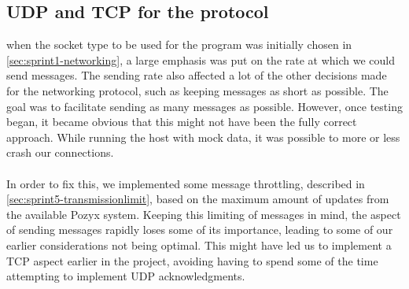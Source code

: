 \subsection{UDP and TCP for the protocol}
when the socket type to be used for the program was initially chosen in \autoref{sec:sprint1-networking}, a large emphasis was put on the rate at which we could send messages.
The sending rate also affected a lot of the other decisions made for the networking protocol, such as keeping messages as short as possible.
The goal was to facilitate sending as many messages as possible.
However, once testing began, it became obvious that this might not have been the fully correct approach.
While running the host with mock data, it was possible to more or less crash our connections.
\\\\
In order to fix this, we implemented some message throttling, described in \autoref{sec:sprint5-transmissionlimit}, based on the maximum amount of updates from the available Pozyx system.
Keeping this limiting of messages in mind, the aspect of sending messages rapidly loses some of its importance, leading to some of our earlier considerations not being optimal.
This might have led us to implement a TCP aspect earlier in the project, avoiding having to spend some of the time attempting to implement UDP acknowledgments. 

